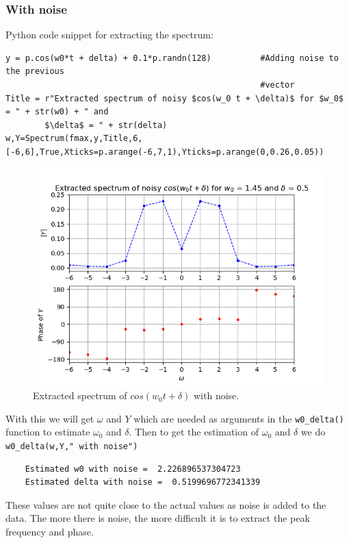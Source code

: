 \documentclass[11pt, a4paper]{article}
\begin{document}
        \subsubsection{With noise}
        Python code snippet for extracting the spectrum:
            \begin{verbatim}
y = p.cos(w0*t + delta) + 0.1*p.randn(128)          #Adding noise to the previous
                                                    #vector
Title = r"Extracted spectrum of noisy $cos(w_0 t + \delta)$ for $w_0$ = " + str(w0) + " and 
        $\delta$ = " + str(delta)
w,Y=Spectrum(fmax,y,Title,6,[-6,6],True,Xticks=p.arange(-6,7,1),Yticks=p.arange(0,0.26,0.05))
            \end{verbatim}
            \begin{figure}[!h]
                \centering
                \includegraphics[scale = 0.65]{Figure 6.png}
                \caption{Extracted spectrum of $cos(w_0 t + \delta)$ with noise.}
                \label{fig:Figure 6}
            \end{figure}
        With this we will get $\omega$ and $Y$ which are needed as arguments in the \texttt{w0\_delta()} function to estimate $\omega_0$ and $\delta$. Then to get the estimation of $\omega_0$ and $\delta$ we do \texttt{w0\_delta(w,Y," with noise")}
        \begin{verbatim}
    Estimated w0 with noise =  2.226896537304723
    Estimated delta with noise =  0.5199696772341339
        \end{verbatim}
        These values are not quite close to the actual values as noise is added to the data. The more there is noise, the more difficult it is to extract the peak frequency and phase.
\end{document}

